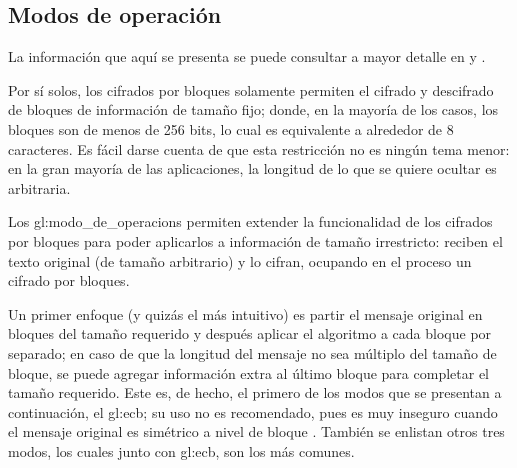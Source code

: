 %
%

\subsection{Modos de operación}

La información que aquí se presenta se puede consultar a mayor detalle en
\cite{modo_de_operacion} y \cite{menezes}.

Por sí solos, los cifrados por bloques solamente permiten el cifrado y
descifrado de bloques de información de tamaño fijo; donde, en la mayoría de
los casos, los bloques son de menos de 256 bits, lo cual es equivalente a
alrededor de 8 caracteres. Es fácil darse cuenta de que esta restricción no es
ningún tema menor: en la gran mayoría de las aplicaciones, la longitud de lo
que se quiere ocultar es arbitraria.

Los \glspl{gl:modo_de_operacion} permiten extender la funcionalidad de los
cifrados por bloques para poder aplicarlos a información de tamaño irrestricto:
reciben el texto original (de tamaño arbitrario) y lo cifran, ocupando en el
proceso un cifrado por bloques.

Un primer enfoque (y quizás el más intuitivo) es partir el mensaje original
en bloques del tamaño requerido y después aplicar el algoritmo a cada bloque
por separado; en caso de que la longitud del mensaje no sea múltiplo del
tamaño de bloque, se puede agregar información extra al último bloque para
completar el tamaño requerido. Este es, de hecho, el primero de los modos que
se presentan a continuación, el \acrfull{gl:ecb}; su uso no es
recomendado, pues es muy inseguro cuando el mensaje original es simétrico a
nivel de bloque \cite{modos_de_operacion}. También se enlistan otros tres
modos, los cuales junto con \acrshort{gl:ecb}, son los más comunes.






